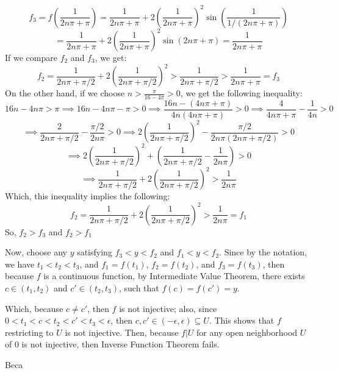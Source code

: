 \documentclass{article}
\begin{document}
$$f_3 = f\left(\frac{1}{2n\pi +\pi}\right)=\frac{1}{2n\pi +\pi}+2\left(\frac{1}{2n\pi +\pi}\right)^2\sin\left(\frac{1}{1/(2n\pi +\pi)}\right)$$
$$=\frac{1}{2n\pi +\pi}+2\left(\frac{1}{2n\pi +\pi}\right)^2\sin(2n\pi+\pi)=\frac{1}{2n\pi +\pi}$$
If we compare $f_2$ and $f_3$, we get:
$$f_2=\frac{1}{2n\pi +\pi/2}+2\left(\frac{1}{2n\pi +\pi/2}\right)^2>\frac{1}{2n\pi +\pi/2}>\frac{1}{2n\pi +\pi}=f_3$$
On the other hand, if we choose $n>\frac{\pi}{16-4\pi}>0$, we get the following inequality:
$$16n-4n\pi > \pi\implies 16n -4n\pi -\pi>0\implies \frac{16n -(4n\pi +\pi)}{4n(4n\pi +\pi)}>0 \implies \frac{4}{4n\pi +\pi}-\frac{1}{4n}>0 $$
$$\implies \frac{2}{2n\pi + \pi/2}-\frac{\pi/2}{2n\pi}>0 \implies 2\left(\frac{1}{2n\pi+\pi/2}\right)^2-\frac{\pi/2}{2n\pi(2n\pi+\pi/2)}>0$$
$$\implies 2\left(\frac{1}{2n\pi+\pi/2}\right)^2+\left(\frac{1}{2n\pi+\pi/2}-\frac{1}{2n\pi}\right)>0$$
$$\implies \frac{1}{2n\pi+\pi/2}+2\left(\frac{1}{2n\pi+\pi/2}\right)^2>\frac{1}{2n\pi}$$
Which, this inequality implies the following:
$$f_2 = \frac{1}{2n\pi+\pi/2}+2\left(\frac{1}{2n\pi+\pi/2}\right)^2 >\frac{1}{2n\pi}=f_1$$
So, $f_2>f_3$ and $f_2>f_1$

Now, choose any $y$ satisfying $f_3<y<f_2$ and $f_1<y<f_2$. Since by the notation, we have $t_1<t_2<t_3$, and $f_1=f(t_1)$, $f_2=f(t_2)$, and $f_3=f(t_3)$,
then because $f$ is a continuous function, by Intermediate Value Theorem, there exists $c\in (t_1,t_2)$ and $c'\in (t_2,t_3)$, such that $f(c)=f(c')=y$.

Which, because $c\neq c'$, then $f$ is not injective; also, since $0<t_1<c<t_2<c'<t_3<\epsilon$, then $c,c'\in (-\epsilon,\epsilon)\subseteq U$.
This shows that $f$ restricting to $U$ is not injective. Then, because $f|U$ for any open neighborhood $U$ of $0$ is not injective, then Inverse Function Theorem fails.

Beca

\break
\end{document}
